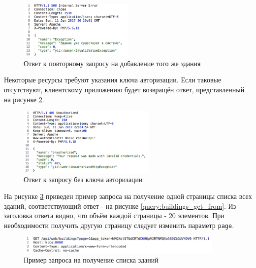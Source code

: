 	\begin{figure}[t!]
		\centering
		\includegraphics[width=0.5\textwidth]{images/queries/buildings_post_err_exists}
		\caption{Ответ к повторному запросу на добавление того же здания}
		\label{query:buildings_post_err_exists}
	\end{figure}

	Некоторые ресурсы требуют указания ключа авторизации. Если таковые отсутствуют, клиентскому приложению будет возвращён ответ, представленный на рисунке \ref{query:buildings_post_err_unauth}.

	\pagebreak

	\begin{figure}[t!]
		\centering
		\includegraphics[width=0.6\textwidth]{images/queries/buildings_post_err_unauth}
		\caption{Ответ к запросу без ключа авторизации}
		\label{query:buildings_post_err_unauth}
	\end{figure}

	На рисунке \ref{query:buildings_get_to} приведен пример запроса на получение одной страницы списка всех зданий, соответствующий ответ - на рисунке \ref{query:buildings_get_from}. Из заголовка ответа видно, что объём каждой страницы - 20 элементов. При необходимости получить другую страницу следует изменить параметр \texttt{page}.

	\begin{figure}[t!]
		\centering
		\includegraphics[width=0.9\textwidth]{images/queries/buildings_get_to}
		\caption{Пример запроса на получение списка зданий}
		\label{query:buildings_get_to}
	\end{figure}

